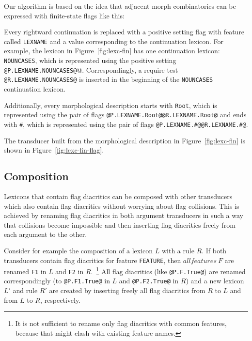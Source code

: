 \documentclass[10pt, a4paper]{article}
\begin{document}
Our algorithm is based on the idea that adjacent morph combinatorics can be expressed with finite-state flags like this:

Every rightward continuation is replaced with a positive setting flag
with feature called \texttt{LEXNAME} and a value corresponding to the
continuation lexicon. For example, the lexicon in
Figure~\ref{fig:lexc-fin} has one continuation lexicon: \texttt{NOUNCASES}, which is represented using the positive setting \verb+@P.LEXNAME.NOUNCASES@+@. Correspondingly, a require test \verb+@R.LEXNAME.NOUNCASES@+ is inserted in the beginning of the \texttt{NOUNCASES} continuation lexicon.

Additionally,
every morphological description starts with \texttt{Root}, which is
represented using the pair of flags
\verb+@P.LEXNAME.Root@@R.LEXNAME.Root@+ and ends with \texttt{\#}, which is represented using the pair of flags \verb+@P.LEXNAME.#@@R.LEXNAME.#@+.

The transducer built from the morphological description in
Figure~\ref{fig:lexc-fin} is shown in Figure~\ref{fig:lexc-fin-flag}.

\subsection{Composition}

Lexicons that contain flag diacritics can be composed with other
transducers which also contain flag diacritics without worrying about
flag collisions. This is achieved by renaming flag diacritics in both
argument transducers in such a way that collisions become impossible
and then inserting flag diacritics freely from each argument to the
other.

Consider for example the composition of a lexicon $L$ with a rule $R$. If
both transducers contain flag diacritics for feature {\tt FEATURE},
then $all features\:F$ are renamed {\tt F1} in $L$ and {\tt F2} in
$R$.~\footnote{It is not sufficient to rename only flag diacritics
  with common features, because that might clash with existing feature
  names.} All flag diacritics (like {\tt @P.F.True@}) are renamed
correspondingly (to {\tt @P.F1.True@} in $L$ and {\tt @P.F2.True@} in
$R$) and a new lexicon $L'$ and rule $R'$ are created by inserting
freely all flag diacritics from $R$ to $L$ and from $L$ to $R$, respectively.
\end{document}
